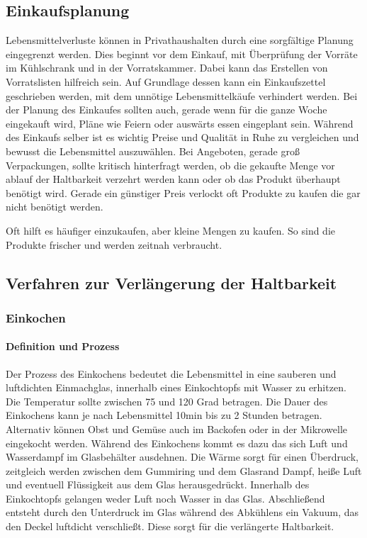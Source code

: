 \subsection{Einkaufsplanung}
Lebensmittelverluste können in Privathaushalten durch eine sorgfältige Planung eingegrenzt werden. Dies beginnt vor dem Einkauf, mit Überprüfung der Vorräte im Kühlschrank und in der Vorratskammer. Dabei kann das Erstellen von Vorratslisten hilfreich sein. Auf Grundlage dessen kann ein Einkaufszettel geschrieben werden, mit dem unnötige Lebensmittelkäufe verhindert werden. Bei der Planung des Einkaufes sollten auch, gerade wenn für die ganze Woche eingekauft wird, Pläne wie Feiern oder auswärts essen eingeplant sein. Während des Einkaufs selber ist es wichtig Preise und Qualität in Ruhe zu vergleichen und bewusst die Lebensmittel auszuwählen. Bei Angeboten, gerade groß Verpackungen, sollte kritisch hinterfragt werden, ob die gekaufte Menge vor ablauf der Haltbarkeit verzehrt werden kann oder ob das Produkt überhaupt benötigt wird. %
Gerade ein günstiger Preis verlockt oft Produkte zu kaufen die gar nicht benötigt werden.

Oft hilft es häufiger einzukaufen, aber kleine Mengen zu kaufen. So sind die Produkte frischer und werden zeitnah verbraucht. %

\subsection{Verfahren zur Verlängerung der Haltbarkeit}
\subsubsection{Einkochen}
\paragraph{Definition und Prozess}
Der Prozess des Einkochens bedeutet die Lebensmittel in eine sauberen und luftdichten Einmachglas, innerhalb eines Einkochtopfs mit Wasser zu erhitzen. Die Temperatur sollte zwischen 75 und 120 Grad betragen. Die Dauer des Einkochens kann je nach Lebensmittel 10min bis zu 2 Stunden betragen. Alternativ können Obst und Gemüse auch im Backofen oder in der Mikrowelle eingekocht werden.
Während des Einkochens kommt es dazu das sich Luft und Wasserdampf im Glasbehälter ausdehnen. Die Wärme sorgt für einen Überdruck, zeitgleich werden zwischen dem Gummiring und dem Glasrand Dampf, heiße Luft und eventuell Flüssigkeit aus dem Glas herausgedrückt. Innerhalb des Einkochtopfs gelangen weder Luft noch Wasser in das Glas. Abschließend entsteht durch den Unterdruck im Glas während des Abkühlens ein Vakuum, das den Deckel luftdicht verschließt. Diese sorgt für die verlängerte Haltbarkeit.   %

